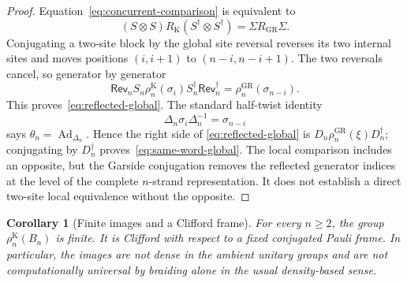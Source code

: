 \documentclass[11pt]{article}
\newtheorem{corollary}[theorem]{Corollary}
\theoremstyle{remark}
\begin{document}
\begin{proof}
Equation~\eqref{eq:concurrent-comparison} is equivalent to
\[
  (S\otimes S)R_{\mathrm K}(S^\dagger\otimes S^\dagger)
  =\Sigma R_{\mathrm{GR}}\Sigma.
\]
Conjugating a two-site block by the global site reversal reverses its two
internal sites and moves positions \((i,i+1)\) to \((n-i,n-i+1)\).  The two
reversals cancel, so generator by generator
\[
  \mathsf{Rev}_nS_n\rho_n^{\mathrm K}(\sigma_i)
  S_n^\dagger\mathsf{Rev}_n^\dagger
  =\rho_n^{\mathrm{GR}}(\sigma_{n-i}).
\]
This proves~\eqref{eq:reflected-global}.  The standard half-twist identity
\[
  \Delta_n\sigma_i\Delta_n^{-1}=\sigma_{n-i}
\]
says \(\theta_n=\operatorname{Ad}_{\Delta_n}\).  Hence the right side of
\eqref{eq:reflected-global} is
\(D_n\rho_n^{\mathrm{GR}}(\xi)D_n^\dagger\); conjugating by \(D_n^\dagger\)
proves~\eqref{eq:same-word-global}.  The local comparison includes an opposite,
but the Garside conjugation removes the reflected generator indices at the
level of the complete \(n\)-strand representation.  It does not establish a
direct two-site local equivalence without the opposite.
\end{proof}

\begin{corollary}[Finite images and a Clifford frame]\label{cor:clifford}
For every \(n\ge2\), the group \(\rho_n^{\mathrm K}(B_n)\) is finite.  It is
Clifford with respect to a fixed conjugated Pauli frame.  In particular, the
images are not dense in the ambient unitary groups and are not computationally
universal by braiding alone in the usual density-based sense.
\end{corollary}
\end{document}
